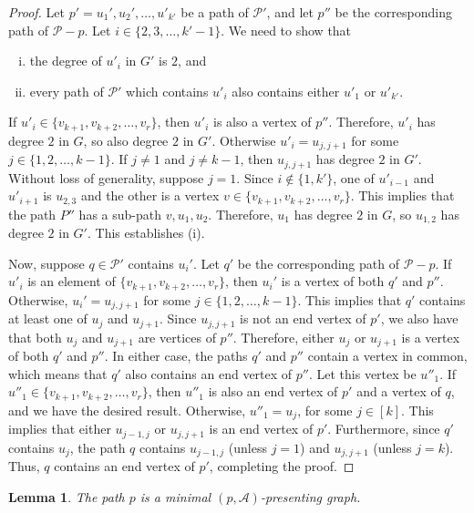 \documentclass[11pt, reqno]{amsart}
\newtheorem{lemma}[theorem]{Lemma}
\begin{document}
\begin{proof}
Let $p' = u_1',u_2',\ldots,u'_{k'}$ be a path of $\mathcal P'$, and let $p''$ be the corresponding path of $\mathcal P - p$. Let $i \in \{2,3,\ldots,k'-1\}$. We need to show that
\begin{enumerate}[(i)]
	\item the degree of $u'_i$ in $G'$ is $2$, and
	\item every path of $\mathcal P'$ which contains $u'_i$ also contains either $u'_1$ or $u'_{k'}$.
\end{enumerate}
	
If $u'_i \in \{v_{k+1},v_{k+2},\ldots,v_r\}$, then $u'_i$ is also a vertex of $p''$. Therefore, $u'_i$ has degree $2$ in $G$, so also degree $2$ in $G'$. Otherwise $u'_i = u_{j,j+1}$ for some $j \in \{1,2,\ldots,k-1\}$. If $j \neq 1$ and $j \neq k-1$, then $u_{j,j+1}$ has degree $2$ in $G'$. Without loss of generality, suppose $j = 1$. Since $i \notin \{1,k'\}$, one of $u'_{i-1}$ and $u'_{i+1}$ is $u_{2,3}$ and the other is a vertex $v \in \{v_{k+1},v_{k+2},\ldots,v_r\}$. This implies that the path $P''$ has a sub-path $v,u_1,u_2$. Therefore, $u_1$ has degree $2$ in $G$, so $u_{1,2}$ has degree $2$ in $G'$. This establishes (i).

Now, suppose $q \in \mathcal P'$ contains $u_i'$. Let $q'$ be the corresponding path of $\mathcal P - p$. If $u'_i$ is an element of $\{v_{k+1},v_{k+2},\ldots,v_r\}$, then $u_i'$ is a vertex of both $q'$ and $p''$. Otherwise, $u_i' = u_{j,j+1}$ for some $j \in \{1,2,\ldots,k-1\}$. This implies that $q'$ contains at least one of $u_j$ and $u_{j+1}$. Since $u_{j,j+1}$ is not an end vertex of $p'$, we also have that both $u_j$ and $u_{j+1}$ are vertices of $p''$. Therefore, either $u_j$ or $u_{j+1}$ is a vertex of both $q'$ and $p''$. In either case, the paths $q'$ and $p''$ contain a vertex in common, which means that $q'$ also contains an end vertex of $p''$. Let this vertex be $u''_1$. If $u''_1 \in \{v_{k+1},v_{k+2},\ldots,v_r\}$, then $u''_1$ is also an end vertex of $p'$ and a vertex of $q$, and we have the desired result. Otherwise, $u''_1 = u_j$, for some $j \in [k]$. This implies that either $u_{j-1,j}$ or $u_{j,j+1}$ is an end vertex of $p'$. Furthermore, since $q'$ contains $u_j$, the path $q$ contains $u_{j-1,j}$ (unless $j=1$) and $u_{j,j+1}$ (unless $j = k$). Thus, $q$ contains an end vertex of $p'$, completing the proof.
\end{proof}

\begin{lemma} \label{lem: path minimal graph}
The path $p$ is a minimal $(p, \mathcal A)$-presenting graph.
\end{lemma}
\end{document}
